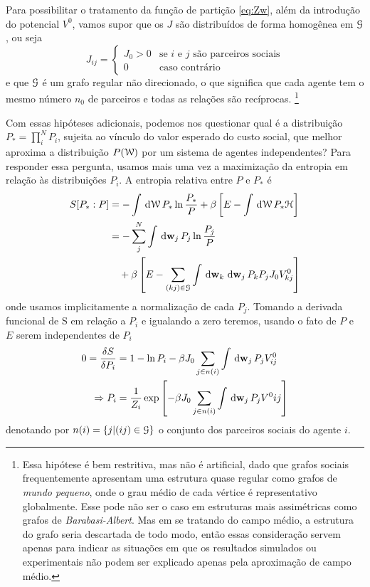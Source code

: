 Para possibilitar o tratamento da função de partição \eqref{eq:Zw}, além da introdução do potencial $V^0$, vamos supor que os $J$ são distribuídos de forma homogênea em $\mathcal{G}$, ou seja
\begin{equation*}
  J_{ij} = \begin{cases}
    J_0 > 0 & \text{se $i$ e $j$ são parceiros sociais} \\
    0 & \text{caso contrário}
    \end{cases}
\end{equation*}
e que $\mathcal{G}$ é um grafo regular não direcionado, o que significa que cada agente tem o mesmo número $n_0$ de parceiros e todas as relações são recíprocas.
\footnote[][-7cm]{Essa hipótese é bem restritiva, mas não é artificial, dado que grafos sociais frequentemente apresentam uma estrutura quase regular como grafos de \emph{mundo pequeno}, onde o grau médio de cada vértice é representativo globalmente.
Esse pode não ser o caso em estruturas mais assimétricas como  grafos de \emph{Barabasi-Albert}.
Mas em se tratando do campo médio, a estrutura do grafo seria descartada de todo modo, então essas consideração servem apenas para indicar as situações em que os resultados simulados ou experimentais não podem ser explicado apenas pela aproximação de campo médio.}

Com essas hipóteses adicionais, podemos nos questionar qual é a distribuição $P_* = \prod_i^N P_i$, sujeita ao vínculo do valor esperado do custo social, que melhor aproxima a distribuição $P(\mathcal{W})$ por um sistema de agentes independentes?
Para responder essa pergunta, usamos mais uma vez a maximização da entropia em relação às distribuições $P_i$.
A entropia relativa entre $P$ e $P_*$ é
\begin{align}
  S[P_*:P] & = -\int \msr{\MM} P_* \ln \frac{P_*}{P}
               + \beta\inbk{E - \int\msr{\MM}P_*\cost} \notag\\
           & = -\sum_j^N\int\msr{\agt{j}}P_j\ln {P_j \over P}
               \notag\\
           & \quad + \beta\inbk{E-\sum_{(kj)\in\SG}\int
                 \msr{\agt{k}}\msr{\agt{j}}P_kP_jJ_0V^0_{kj}}
               \label{eq:ent-P*}
\end{align}
onde usamos implicitamente a normalização de cada $P_j$.
Tomando a derivada funcional de S em relação a $P_i$ e igualando a zero teremos, usando o fato de $P$ e $E$ serem independentes de $P_i$
\begin{align}
   0 = {\delta S \over \delta P_i} & = 1 - \ln P_i -\beta J_0\sum_{j\in n(i)}\int\msr{\agt{j}}P_jV^0_{ij} \notag\\
  \Rightarrow P_i & = \frac{1}{Z_i}\exp\inbk{-\beta J_0 \sum_{j\in n(i)}\int \msr{\agt{j}}P_j V^0{ij}} \label{eq:PiV}
\end{align}
denotando por $n(i) = \{j | (ij)\in \mathcal{G} \}$ o conjunto dos parceiros sociais do agente $i$.

